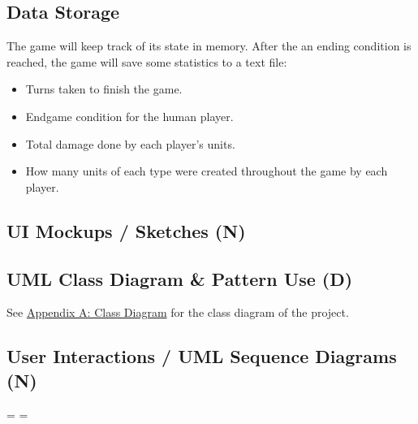 \documentclass[11pt]{amsart}
\begin{document}
\subsection*{Data Storage} \phantom{}

The game will keep track of its state in memory. After the an ending condition is reached, the game will save some statistics to a text file:
\begin{itemize}
    \item Turns taken to finish the game.
    \item Endgame condition for the human player.
    \item Total damage done by each player's units.
    \item How many units of each type were created throughout the game by each player.
\end{itemize}

\subsection*{UI Mockups / Sketches (N)} \phantom{}
\subsection*{UML Class Diagram \& Pattern Use (D)} \phantom{}

See \hyperref[sec:appendixa]{Appendix A: Class Diagram} for the class diagram of the project.

\subsection*{User Interactions / UML Sequence Diagrams (N)} \phantom{}


\newpage
\paperwidth=45in
\paperheight=8in
\pdfpagewidth=\paperwidth
\pdfpageheight=\paperheight





% 
\end{document}
